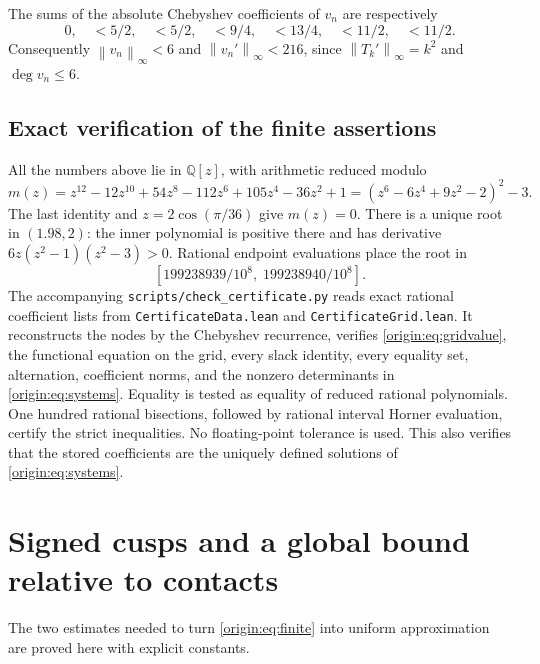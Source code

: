 \documentclass[11pt]{article}
\theoremstyle{remark}\newtheorem{remark}[theorem]{Remark}
\newcommand{\norm}[1]{\left\lVert #1\right\rVert_\infty}
\begin{document}
The sums of the absolute Chebyshev coefficients of $v_n$ are respectively
\[
 0,\quad <5/2,\quad <5/2,\quad <9/4,\quad <13/4,\quad <11/2,\quad <11/2.
\]
Consequently $\norm{v_n}<6$ and $\norm{v_n'}<216$, since
$\norm{T_k'}=k^2$ and $\deg v_n\le6$.

\subsection*{Exact verification of the finite assertions}
All the numbers above lie in $\mathbb Q[z]$, with arithmetic reduced modulo
\[
 m(z)=z^{12}-12z^{10}+54z^8-112z^6+105z^4-36z^2+1
      =(z^6-6z^4+9z^2-2)^2-3.
\]
The last identity and $z=2\cos(\pi/36)$ give $m(z)=0$. There is a unique root
in $(1.98,2)$: the inner polynomial is positive there and has derivative
$6z(z^2-1)(z^2-3)>0$. Rational endpoint evaluations place the root in
\[
 [199238939/10^8,\;199238940/10^8].
\]
The accompanying \texttt{scripts/check\_certificate.py} reads exact rational
coefficient lists from \texttt{CertificateData.lean} and
\texttt{CertificateGrid.lean}. It reconstructs the nodes by the Chebyshev
recurrence, verifies \eqref{origin:eq:gridvalue}, the functional equation on the grid,
every slack identity, every equality set, alternation, coefficient norms, and
the nonzero determinants in \eqref{origin:eq:systems}. Equality is tested as equality
of reduced rational polynomials. One hundred rational bisections, followed by
rational interval Horner evaluation, certify the strict inequalities. No
floating-point tolerance is used. This also verifies that the stored
coefficients are the uniquely defined solutions of \eqref{origin:eq:systems}.

\section{Signed cusps and a global bound relative to contacts}
The two estimates needed to turn \eqref{origin:eq:finite} into uniform approximation
are proved here with explicit constants.
\end{document}
